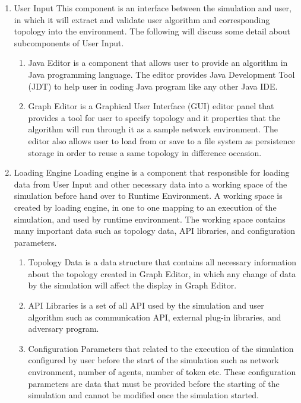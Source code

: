 \begin{enumerate}
\item{User Input}
This component is an interface between the simulation and user, in which it will extract and validate user algorithm and corresponding topology into the environment. The following will discuss some detail about subcomponents of User Input.

\begin{enumerate}
\item{Java Editor} is a component that allows user to provide an algorithm in Java programming language. The editor provides Java Development Tool (JDT) to help user in coding Java program like any other Java IDE.

\item{Graph Editor} is a Graphical User Interface (GUI) editor panel that provides a tool for user to specify topology and it properties that the algorithm will run through it as a sample network environment. The editor also allows user to load from or save to a file system as persistence storage in order to reuse a same topology in difference occasion.
\end{enumerate}

\item{Loading Engine}
Loading engine is a component that responsible for loading data from User Input and other necessary data into a working space of the simulation before hand over to Runtime Environment. A working space is created by loading engine, in one to one mapping to an execution of the simulation, and used by runtime environment. The working space contains many important data such as topology data, API libraries, and configuration parameters.

\begin{enumerate}
\item{Topology Data} is a data structure that contains all necessary information about the topology created in Graph Editor, in which any change of data by the simulation will affect the display in Graph Editor.

\item{API Libraries} is a set of all API used by the simulation and user algorithm such as communication API, external plug-in libraries, and adversary program.

\item{Configuration Parameters} that related to the execution of the simulation configured by user before the start of the simulation such as network environment, number of agents, number of token etc. These configuration parameters are data that must be provided before the starting of the simulation and cannot be modified once the simulation started.
\end{enumerate}
\end{enumerate}


